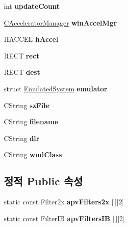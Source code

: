 \begin{DoxyCompactItemize}
int {\bfseries update\+Count}
\item 
\mbox{\label{class_v_b_a_ad7ebce057dbde0ca88cee75e84721a89}} 
\mbox{\hyperlink{class_c_accelerator_manager}{C\+Accelerator\+Manager}} {\bfseries win\+Accel\+Mgr}
\item 
\mbox{\label{class_v_b_a_a6ca8052bfc1574a9ef8ca4482563e1e3}} 
H\+A\+C\+C\+EL {\bfseries h\+Accel}
\item 
\mbox{\label{class_v_b_a_a1303c6cf4f955c31d828de3fe77355f1}} 
R\+E\+CT {\bfseries rect}
\item 
\mbox{\label{class_v_b_a_aed77fc82f818810cc87c470768c75e05}} 
R\+E\+CT {\bfseries dest}
\item 
\mbox{\label{class_v_b_a_ab40fc008c6714c3c8670eb8a9085a4a1}} 
struct \mbox{\hyperlink{struct_emulated_system}{Emulated\+System}} {\bfseries emulator}
\item 
\mbox{\label{class_v_b_a_ac85720ef4e00c5455be15266b7119045}} 
C\+String {\bfseries sz\+File}
\item 
\mbox{\label{class_v_b_a_a66eee6b61ec8bee20f21164cb0c37d2d}} 
C\+String {\bfseries filename}
\item 
\mbox{\label{class_v_b_a_a7177c0b51e84b91c6027ea73461c457e}} 
C\+String {\bfseries dir}
\item 
\mbox{\label{class_v_b_a_acd3b584c09c85ec31168b1f7d1d8505e}} 
C\+String {\bfseries wnd\+Class}
\end{DoxyCompactItemize}
\subsection*{정적 Public 속성}
\begin{DoxyCompactItemize}
\item 
static const Filter2x {\bfseries apv\+Filters2x} \mbox{[}$\,$\mbox{]}\mbox{[}2\mbox{]}
\item 
static const Filter\+IB {\bfseries apv\+Filters\+IB} \mbox{[}$\,$\mbox{]}\mbox{[}2\mbox{]}
\end{DoxyCompactItemize}



